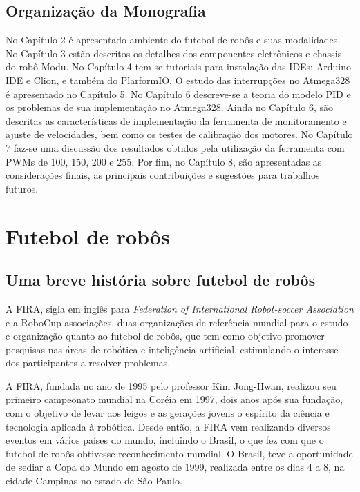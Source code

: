 \documentclass[a4paper,12pt,portuguese]{ufms-cpcx}
\begin{document}
\section {Organização da Monografia}
No Capítulo 2 é apresentado ambiente do futebol de robôs e suas modalidades.
No Capítulo 3 estão descritos os detalhes dos componentes eletrônicos e chassis do robô Modu.
No Capítulo 4 tem-se tutoriais para instalação das IDEs: Arduino IDE e Clion, e também do PlarformIO.
O estudo das interrupções no Atmega328 é apresentado no Capítulo 5.
No Capítulo 6 descreve-se a teoria do modelo PID e os problemas de sua implementação no Atmega328. Ainda no Capítulo 6, são descritas as características de implementação da ferramenta de monitoramento e ajuste de velocidades, bem como os testes de calibração dos motores.
No Capítulo 7 faz-se uma discussão dos resultados obtidos pela utilização da ferramenta com PWMs de 100, 150, 200 e 255.
Por fim, no Capítulo 8, são apresentadas as considerações finais, as principais contribuições e sugestões para trabalhos futuros.


\chapter{Futebol de robôs}
%

\section{Uma breve história sobre futebol de robôs}
A FIRA, sigla em inglês para \textit{Federation of International Robot-soccer Association} e a RoboCup associações, duas organizações de referência mundial para o estudo e organização quanto ao futebol de robôs, que tem como objetivo promover pesquisas nas áreas de robótica e inteligência artificial, estimulando o interesse dos participantes a resolver problemas. 

A FIRA, fundada no ano de 1995 pelo professor Kim Jong-Hwan, realizou seu primeiro campeonato mundial na Coréia em 1997, dois anos após sua fundação, com o objetivo de levar aos leigos e as gerações jovens o espírito da ciência e tecnologia aplicada à robótica. Desde então, a FIRA vem realizando diversos eventos em vários países do mundo, incluindo o Brasil, o que fez com que o futebol de robôs obtivesse reconhecimento mundial. O Brasil, teve a oportunidade de sediar a Copa do Mundo em agosto de 1999, realizada entre os dias 4 a 8, na cidade Campinas no estado de São Paulo.
\end{document}
